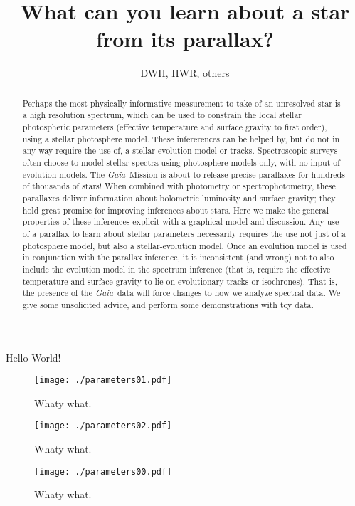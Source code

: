 \documentclass[12pt, preprint]{aastex}
\newcommand{\project}[1]{\textsl{#1}}
\newcommand{\gaia}{\project{Gaia}}
\begin{document}
\title{What can you learn about a star from its parallax?}
\author{DWH, HWR, others}

\begin{abstract}
Perhaps the most physically informative measurement to take of
an unresolved star is a high resolution spectrum, which can be used
to constrain the local stellar photospheric parameters (effective
temperature and surface gravity to first order), using a stellar
photosphere model.
These infererences can be helped by, but do not in any way require
the use of, a stellar evolution model or tracks.
Spectroscopic surveys often choose to model stellar
spectra using photosphere models only, with no input of evolution
models.
The \gaia\ Mission is about to release precise parallaxes for hundreds
of thousands of stars!
When combined with photometry or spectrophotometry, these parallaxes
deliver information about bolometric luminosity and surface gravity;
they hold great promise for improving inferences about stars.
Here we make the general properties of these inferences explicit with
a graphical model and discussion.
Any use of a parallax
to learn about stellar parameters necessarily requires the use not
just of a photosphere model, but also a stellar-evolution
model.
Once an evolution model is used in conjunction with the parallax
inference, it is inconsistent (and wrong) not to also include the
evolution model in the spectrum inference (that is, require the
effective temperature and surface gravity to lie on evolutionary
tracks or isochrones).
That is, the presence of the \gaia\ data will force changes to how
we analyze spectral data.
We give some unsolicited advice, and perform some demonstrations with toy data.
\end{abstract}


Hello World!

\clearpage
\begin{figure}
\texttt{[image: ./parameters01.pdf]}
\caption{Whaty what.\label{good}}
\end{figure}

\clearpage
\begin{figure}
\texttt{[image: ./parameters02.pdf]}
\caption{Whaty what.\label{complex}}
\end{figure}

\clearpage
\begin{figure}
\texttt{[image: ./parameters00.pdf]}
\caption{Whaty what.\label{bad}}
\end{figure}
\end{document}
